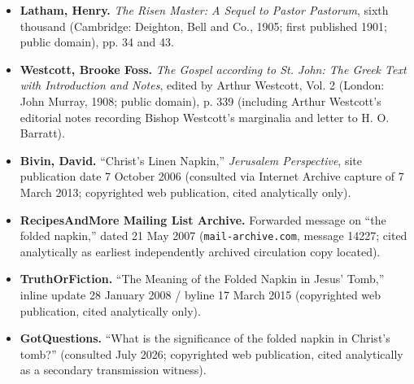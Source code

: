\begin{itemize}
\item \textbf{Latham, Henry.} \emph{The Risen Master: A Sequel to Pastor Pastorum}, sixth thousand (Cambridge: Deighton, Bell and Co., 1905; first published 1901; public domain), pp. 34 and 43.
\item \textbf{Westcott, Brooke Foss.} \emph{The Gospel according to St. John: The Greek Text with Introduction and Notes}, edited by Arthur Westcott, Vol. 2 (London: John Murray, 1908; public domain), p. 339 (including Arthur Westcott's editorial notes recording Bishop Westcott's marginalia and letter to H. O. Barratt).
\item \textbf{Bivin, David.} ``Christ's Linen Napkin,'' \emph{Jerusalem Perspective}, site publication date 7 October 2006 (consulted via Internet Archive capture of 7 March 2013; copyrighted web publication, cited analytically only).
\item \textbf{RecipesAndMore Mailing List Archive.} Forwarded message on ``the folded napkin,'' dated 21 May 2007 (\texttt{mail-archive.com}, message 14227; cited analytically as earliest independently archived circulation copy located).
\item \textbf{TruthOrFiction.} ``The Meaning of the Folded Napkin in Jesus' Tomb,'' inline update 28 January 2008 / byline 17 March 2015 (copyrighted web publication, cited analytically only).
\item \textbf{GotQuestions.} ``What is the significance of the folded napkin in Christ's tomb?'' (consulted July 2026; copyrighted web publication, cited analytically as a secondary transmission witness).
\end{itemize}
